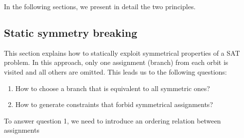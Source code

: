 In the following sections, we present in detail the two principles.

\subsection{Static symmetry breaking}

This section explains how to statically exploit symmetrical properties of a SAT problem.
In this approach, only one assignment (branch) from each orbit is visited and all others are
omitted.%
This leads us to the following questions:
\begin{enumerate}
 \item How  to choose a branch that is equivalent to all symmetric ones?
 \item How to generate constraints that forbid symmetrical assignments?
\end{enumerate}
To answer question 1, we need to introduce an ordering relation between assignments

